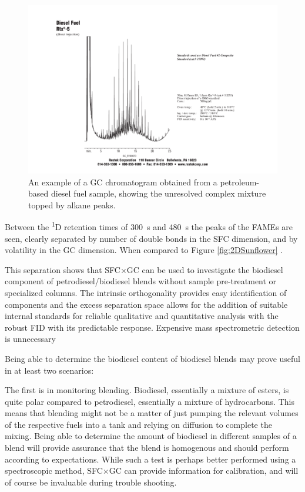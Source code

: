 \begin{figure}
	\centering
	\includegraphics[width=\textwidth]{Figures/hchump.pdf}
	\decoRule	
	
\caption[An example of a petrochemical fuel chromatogram.]{An example of a GC
chromatogram obtained from a petroleum-based diesel fuel sample, showing the
unresolved complex mixture topped by alkane peaks.}
	
	\label{fig:HCHump} 
\end{figure}

Between the \textsuperscript{1}D retention times of \SI{300}{\second} and
\SI{480}{\second} the peaks of the FAMEs are seen, clearly separated by number
of double bonds in the SFC dimension, and by volatility in the GC dimension.
When compared to Figure \ref{fig:2DSunflower} .

This separation shows that SFC×GC can be used to investigate the biodiesel
component of petrodiesel/biodiesel blends without sample pre-treatment or
specialized columns. The intrinsic orthogonality provides easy identification of
components and the excess separation space allows for the addition of suitable
internal standards for reliable qualitative and quantitative analysis with the
robust FID with its predictable response. Expensive
mass spectrometric detection is unnecessary

Being able to determine the biodiesel content of biodiesel blends may prove
useful in at least two scenarios: 

The first is in monitoring blending. Biodiesel, essentially a mixture of esters,
is quite polar compared to petrodiesel, essentially a mixture of hydrocarbons.
This means that blending might not be a matter of just pumping the relevant volumes
of the respective fuels into a tank and relying on diffusion to complete the
mixing. Being able to determine the amount of biodiesel in different samples of
a blend will provide assurance that the blend is homogenous and should perform
according to expectations. While such a test is perhaps better performed using a
spectroscopic method, SFC×GC can provide information for calibration, and will
of course be invaluable during trouble shooting.  

